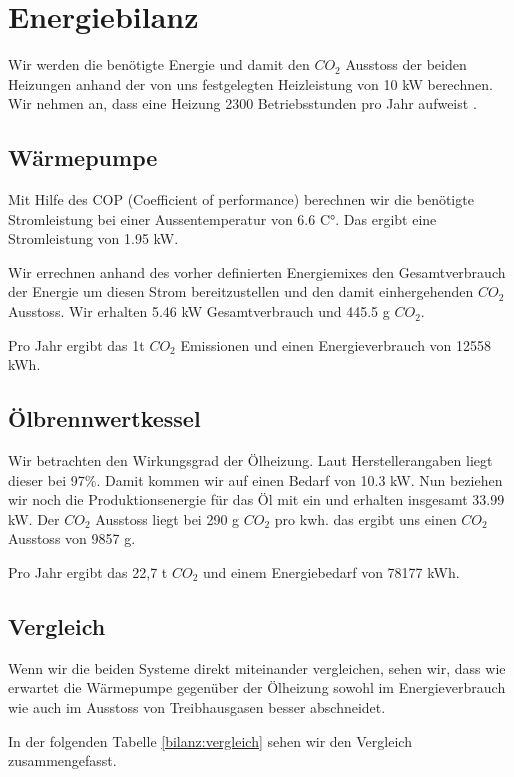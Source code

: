 \chapter{Energiebilanz}
\label{chap:bilanz}

Wir werden die benötigte Energie und damit den $CO_2$ Ausstoss der beiden
Heizungen anhand der von uns festgelegten Heizleistung von 10 kW berechnen.
Wir nehmen an, dass eine Heizung 2300 Betriebsstunden pro Jahr aufweist
\cite{heizung:heizung}.

\section{Wärmepumpe}

Mit Hilfe des COP (Coefficient of performance) berechnen wir die benötigte Stromleistung bei einer
Aussentemperatur von 6.6 C°.
Das ergibt eine Stromleistung von 1.95 kW.

Wir errechnen anhand des vorher definierten Energiemixes den Gesamtverbrauch
der Energie um diesen Strom bereitzustellen und den damit einhergehenden $CO_2$
Ausstoss.
Wir erhalten 5.46 kW Gesamtverbrauch und 445.5 g $CO_2$.

Pro Jahr ergibt das 1t $CO_2$ Emissionen und einen Energieverbrauch von 12558 kWh.

\section{Ölbrennwertkessel}

Wir betrachten den Wirkungsgrad der Ölheizung.
Laut Herstellerangaben liegt dieser bei 97\%.
Damit kommen wir auf einen Bedarf von 10.3 kW.
Nun beziehen wir noch die Produktionsenergie für das Öl mit ein und erhalten
insgesamt 33.99 kW.
Der $CO_2$ Ausstoss liegt bei 290 g $CO_2$ pro kwh.\cite{heizung:co2vergleich}
das ergibt uns einen $CO_2$ Ausstoss von 9857 g.

Pro Jahr ergibt das 22,7 t $CO_2$ und einem Energiebedarf von 78177 kWh.


\section{Vergleich}

Wenn wir die beiden Systeme direkt miteinander vergleichen, sehen wir, dass
wie erwartet die Wärmepumpe gegenüber der Ölheizung
sowohl im Energieverbrauch wie auch im Ausstoss von Treibhausgasen besser abschneidet.

In der folgenden Tabelle \ref{bilanz:vergleich} sehen wir den Vergleich zusammengefasst.

